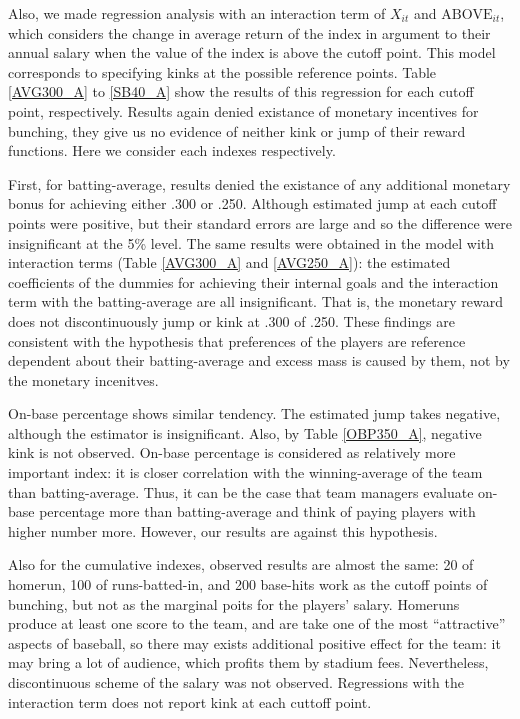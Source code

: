 \documentclass[dvipdfmx, 12pt]{article}
\begin{document}
Also, we made regression analysis with an interaction term of $X_{it}$ and $\text{ABOVE}_{it}$, which considers the change in average return of the index in argument to their annual salary when the value of the index is above the cutoff point. This model corresponds to specifying kinks at the possible reference points. Table \ref{AVG300_A} to \ref{SB40_A} show the results of this regression for each cutoff point, respectively. Results again denied existance of monetary incentives for bunching, they give us no evidence of neither kink or jump of their reward functions. Here we consider each indexes respectively.

First, for batting-average, results denied the existance of any additional monetary bonus for achieving either .300 or .250. Although estimated jump at each cutoff points were positive, but their standard errors are large and so the difference were insignificant at the 5\% level. The same results were obtained in the model with interaction terms (Table \ref{AVG300_A} and \ref{AVG250_A}): the estimated coefficients of the dummies for achieving their internal goals and the interaction term with the batting-average are all insignificant. That is, the monetary reward does not discontinuously jump or kink at .300 of .250. These findings are consistent with the hypothesis that preferences of the players are reference dependent about their batting-average and excess mass is caused by them, not by the monetary incenitves.

On-base percentage shows similar tendency. The estimated jump takes negative, although the estimator is insignificant. Also, by Table \ref{OBP350_A}, negative kink is not observed. On-base percentage is considered as relatively more important index: it is closer correlation with the winning-average of the team than batting-average. Thus, it can be the case that team managers evaluate on-base percentage more than batting-average and think of paying players with higher number more. However, our results are against this hypothesis.

Also for the cumulative indexes, observed results are almost the same: 20 of homerun, 100 of runs-batted-in, and 200 base-hits work as the cutoff points of bunching, but not as the marginal poits for the players' salary. Homeruns produce at least one score to the team, and are take one of the most ``attractive'' aspects of baseball, so there may exists additional positive effect for the team: it may bring a lot of audience, which profits them by stadium fees. Nevertheless, discontinuous scheme of the salary was not observed. Regressions with the interaction term does not report kink at each cuttoff point.
\end{document}

